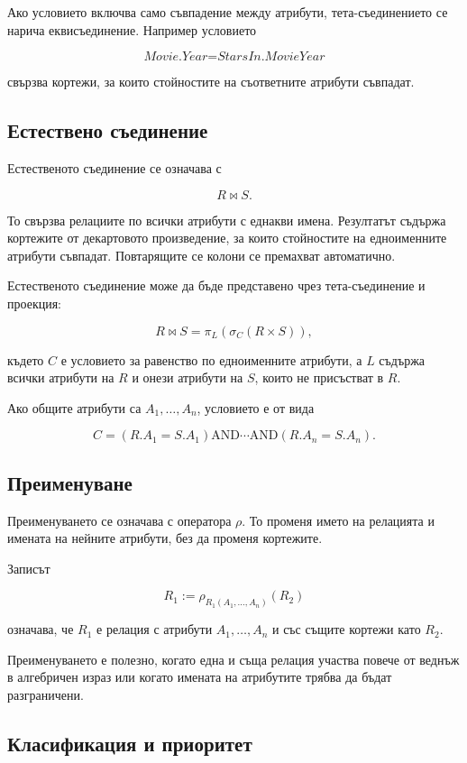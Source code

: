 Ако условието включва само съвпадение между атрибути, тета-съединението се нарича еквисъединение. Например условието

\[
\textit{Movie.Year}=\textit{StarsIn.MovieYear}
\]

свързва кортежи, за които стойностите на съответните атрибути съвпадат.

\subsection{Естествено съединение}\label{s:23.4.8}

Естественото съединение се означава с

\[
R\bowtie S.
\]

То свързва релациите по всички атрибути с еднакви имена. Резултатът съдържа кортежите от декартовото произведение, за които стойностите на едноименните атрибути съвпадат. Повтарящите се колони се премахват автоматично.

Естественото съединение може да бъде представено чрез тета-съединение и проекция:

\[
R\bowtie S
=
\pi_L\left(\sigma_C(R\times S)\right),
\]

където $C$ е условието за равенство по едноименните атрибути, а $L$ съдържа всички атрибути на $R$ и онези атрибути на $S$, които не присъстват в $R$.

Ако общите атрибути са $A_1,\ldots,A_n$, условието е от вида

\[
C=(R.A_1=S.A_1)\mathbin{\mathrm{AND}}\cdots
\mathbin{\mathrm{AND}}(R.A_n=S.A_n).
\]

\subsection{Преименуване}\label{s:23.4.9}

Преименуването се означава с оператора $\rho$. То променя името на релацията и имената на нейните атрибути, без да променя кортежите.

Записът

\[
R_1:=\rho_{R_1(A_1,\ldots,A_n)}(R_2)
\]

означава, че $R_1$ е релация с атрибути $A_1,\ldots,A_n$ и със същите кортежи като $R_2$.

Преименуването е полезно, когато една и съща релация участва повече от веднъж в алгебричен израз или когато имената на атрибутите трябва да бъдат разграничени.

\subsection{Класификация и приоритет}\label{s:23.4.10}

